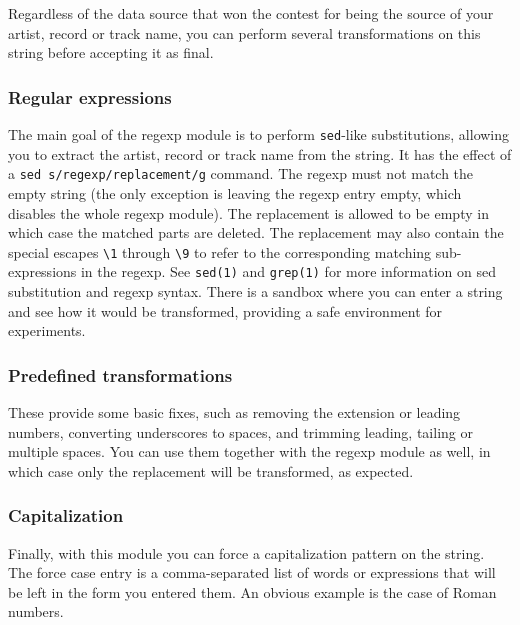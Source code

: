 \documentclass[10pt,english]{article}
\begin{document}
Regardless of the data source that won the contest for
being the source of your artist, record or track name, you
can perform several transformations on this string before
accepting it as final.




\subsubsection{Regular expressions\label{idp686080}}



\noindent The main goal of the regexp module is to perform
\texttt{sed}-like substitutions, allowing you to extract
the artist, record or track name from the string. It has the
effect of a \texttt{sed s/regexp/replacement/g}
command. The regexp must not match the empty string (the
only exception is leaving the regexp entry empty, which
disables the whole regexp module). The replacement is
allowed to be empty in which case the matched parts are
deleted. The replacement may also contain the special
escapes \texttt{\textbackslash{}1} through \texttt{\textbackslash{}9} to refer to the
corresponding matching sub-expressions in the regexp. See
\texttt{sed(1)} and \texttt{grep(1)} for more
information on sed substitution and regexp syntax. There is
a sandbox where you can enter a string and see how it would
be transformed, providing a safe environment for
experiments.




\subsubsection{Predefined transformations\label{idp690560}}



\noindent These provide some basic fixes, such as removing the
extension or leading numbers, converting underscores to
spaces, and trimming leading, tailing or multiple
spaces. You can use them together with the regexp module as
well, in which case only the replacement will be
transformed, as expected.




\subsubsection{Capitalization\label{idp691968}}



\noindent Finally, with this module you can force a capitalization
pattern on the string. The force case entry is a
comma-separated list of words or expressions that will be
left in the form you entered them. An obvious example is the
case of Roman numbers.
\end{document}
